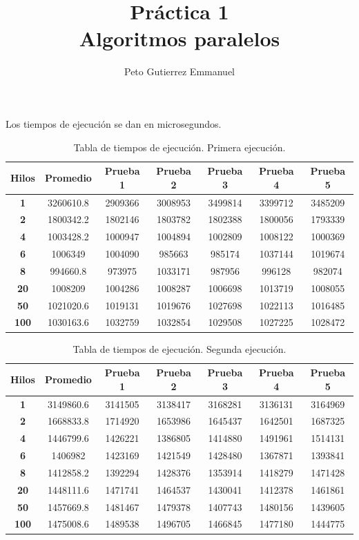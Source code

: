 \documentclass{article}
\title{Práctica 1\\Algoritmos paralelos}
\author{Peto Gutierrez Emmanuel}
\begin{document}
\maketitle

Los tiempos de ejecución se dan en microsegundos.

\begin{table}[h]
\begin{tabular}{|c|c|c|c|c|c|c|}
\hline
\textbf{Hilos} & \textbf{Promedio} & \textbf{Prueba 1} & \textbf{Prueba 2} & \textbf{Prueba 3} & \textbf{Prueba 4} & \textbf{Prueba 5}\\
\hline
\textbf{1} & 3260610.8 & 2909366 & 3008953 & 3499814 & 3399712 & 3485209 \\
\hline
\textbf{2} & 1800342.2 & 1802146 & 1803782 & 1802388 & 1800056 & 1793339 \\
\hline
\textbf{4} & 1003428.2 & 1000947 & 1004894 & 1002809 & 1008122 & 1000369 \\
\hline
\textbf{6} & 1006349 & 1004090 & 985663 & 985174 & 1037144 & 1019674 \\
\hline
\textbf{8} & 994660.8 & 973975 & 1033171 & 987956 & 996128 & 982074 \\
\hline
\textbf{20} & 1008209 & 1004286 & 1008287 & 1006698 & 1013719 & 1008055 \\
\hline
\textbf{50} & 1021020.6 & 1019131 & 1019676 & 1027698 & 1022113 & 1016485 \\
\hline
\textbf{100} & 1030163.6 & 1032759 & 1032854 & 1029508 & 1027225 & 1028472 \\
\hline
\end{tabular}
\caption{Tabla de tiempos de ejecución. Primera ejecución.}
\label{table:1}
\end{table}

\begin{table}[h]
\begin{tabular}{|c|c|c|c|c|c|c|}
\hline
\textbf{Hilos} & \textbf{Promedio} & \textbf{Prueba 1} & \textbf{Prueba 2} & \textbf{Prueba 3} & \textbf{Prueba 4} & \textbf{Prueba 5}\\
\hline
\textbf{1} & 3149860.6 & 3141505 & 3138417 & 3168281 & 3136131 & 3164969 \\
\hline
\textbf{2} & 1668833.8 & 1714920 & 1653986 & 1645437 & 1642501 & 1687325 \\
\hline
\textbf{4} & 1446799.6 & 1426221 & 1386805 & 1414880 & 1491961 & 1514131 \\
\hline
\textbf{6} & 1406982 & 1423169 & 1421549 & 1428480 & 1367871 & 1393841 \\
\hline
\textbf{8} & 1412858.2 & 1392294 & 1428376 & 1353914 & 1418279 & 1471428 \\
\hline
\textbf{20} & 1448111.6 & 1471741 & 1464537 & 1430041 & 1412378 & 1461861 \\
\hline
\textbf{50} & 1457669.8 & 1481467 & 1479378 & 1407743 & 1480156 & 1439605 \\
\hline
\textbf{100} & 1475008.6 & 1489538 & 1496705 & 1466845 & 1477180 & 1444775 \\
\hline
\end{tabular}
\caption{Tabla de tiempos de ejecución. Segunda ejecución.}
\label{table:2}
\end{table}
\end{document}
